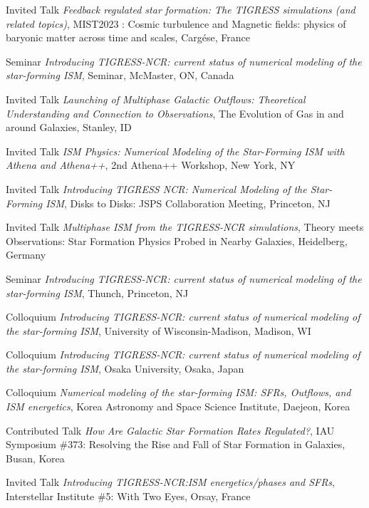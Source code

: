 \documentclass[12pt]{article}
\begin{document}
{Invited Talk}
{\emph{Feedback regulated star formation: The TIGRESS simulations (and related topics)},
MIST2023 : Cosmic turbulence and Magnetic fields: physics of baryonic matter across time and scales,
Carg\'ese, France}

{Seminar}
{\emph{Introducing TIGRESS-NCR: current status of numerical modeling of the star-forming ISM},
Seminar,
McMaster, ON, Canada}

{Invited Talk}
{\emph{Launching of Multiphase Galactic Outflows: Theoretical Understanding and Connection to Observations},
The Evolution of Gas in and around Galaxies,
Stanley, ID}

{Invited Talk}
{\emph{ISM Physics: Numerical Modeling of the Star-Forming ISM with Athena and Athena++},
2nd Athena++ Workshop,
New York, NY}

{Invited Talk}
{\emph{Introducing TIGRESS NCR: Numerical Modeling of the Star-Forming ISM},
Disks to Disks: JSPS Collaboration Meeting,
Princeton, NJ}

{Invited Talk}
{\emph{Multiphase ISM from the TIGRESS-NCR simulations},
Theory meets Observations: Star Formation Physics Probed in Nearby Galaxies,
Heidelberg, Germany}

{Seminar}
{\emph{Introducing TIGRESS-NCR: current status of numerical modeling of the star-forming ISM},
Thunch,
Princeton, NJ}

{Colloquium}
{\emph{Introducing TIGRESS-NCR: current status of numerical modeling of the star-forming ISM},
University of Wisconsin-Madison,
Madison, WI}

{Colloquium}
{\emph{Introducing TIGRESS-NCR: current status of numerical modeling of the star-forming ISM},
Osaka University,
Osaka, Japan}

{Colloquium}
{\emph{Numerical modeling of the star-forming ISM:  SFRs, Outflows, and ISM energetics},
Korea Astronomy and Space Science Institute,
Daejeon, Korea}

{Contributed Talk}
{\emph{How Are Galactic Star Formation Rates Regulated?},
IAU Symposium \#373: Resolving the Rise and Fall of Star Formation in Galaxies,
Busan, Korea}

{Invited Talk}
{\emph{Introducing TIGRESS-NCR:ISM energetics/phases and SFRs},
Interstellar Institute \#5: With Two Eyes,
Orsay, France}
\end{document}
